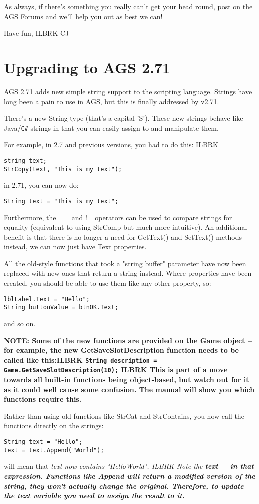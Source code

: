 As always, if there's something you really can't get your head round, post on the
AGS Forums and we'll help you out as best we can!

Have fun, ILBRK
CJ


\chapter{Upgrading to AGS 2.71}\label{UpgradingTo271}%

AGS 2.71 adds new simple string support to the scripting language. Strings have long
been a pain to use in AGS, but this is finally addressed by v2.71.

There's a new String type (that's a capital 'S'). These new strings behave like Java/\verb$C#$
strings in that you can easily assign to and manipulate them.

For example, in 2.7 and previous versions, you had to do this: ILBRK
\begin{verbatim}
string text;
StrCopy(text, "This is my text");
\end{verbatim}
in 2.71, you can now do:
\begin{verbatim}
String text = "This is my text";
\end{verbatim}
Furthermore, the == and != operators can be used to compare strings for equality (equivalent
to using StrComp but much more intuitive). An additional benefit is that there is no longer
a need for GetText() and SetText() methods -- instead, we can now just have Text properties.

All the old-style functions that took a "string buffer" parameter have now been replaced with
new ones that return a string instead. Where properties have been created, you should be able
to use them like any other property, so:
\begin{verbatim}
lblLabel.Text = "Hello";
String buttonValue = btnOK.Text;
\end{verbatim}
and so on.

\bf{NOTE:} Some of the new functions are provided on the Game object -- for example, the new
GetSaveSlotDescription function needs to be called like this:ILBRK
\verb$String description = Game.GetSaveSlotDescription(10);$ ILBRK
This is part of a move towards all built-in functions being object-based, but watch out for it
as it could well cause some confusion. The manual will show you which functions require this.

Rather than using old functions like StrCat and StrContains, you now call the functions
directly on the strings:
\begin{verbatim}
String text = "Hello";
text = text.Append("World");
\end{verbatim}
will mean that \it{text} now contains "HelloWorld". ILBRK
Note the \bf{text =} in that expression. Functions like Append will return a modified version
of the string, they won't actually change the original. Therefore, to update the \it{text}
variable you need to assign the result to it.

